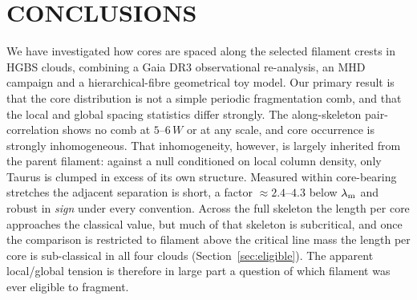 \documentclass[usenatbib,twoside,twocolumn]{mnras}
\begin{document}
\section{CONCLUSIONS}

We have investigated how cores are spaced along the selected filament crests in HGBS clouds, combining a Gaia DR3 observational re-analysis, an MHD campaign and a hierarchical-fibre geometrical toy model. Our primary result is that the core distribution is not a simple periodic fragmentation comb, and that the local and global spacing statistics differ strongly. The along-skeleton pair-correlation shows no comb at $5$--$6\,W$ or at any scale, and core occurrence is strongly inhomogeneous. That inhomogeneity, however, is largely inherited from the parent filament: against a null conditioned on local column density, only Taurus is clumped in excess of its own structure. Measured within core-bearing stretches the adjacent separation is short, a factor $\approx2.4$--$4.3$ below $\lambda_{\rm m}$ and robust in \emph{sign} under every convention. Across the full skeleton the length per core approaches the classical value, but much of that skeleton is subcritical, and once the comparison is restricted to filament above the critical line mass the length per core is sub-classical in all four clouds (Section~\ref{sec:eligible}). The apparent local/global tension is therefore in large part a question of which filament was ever eligible to fragment.
\end{document}
